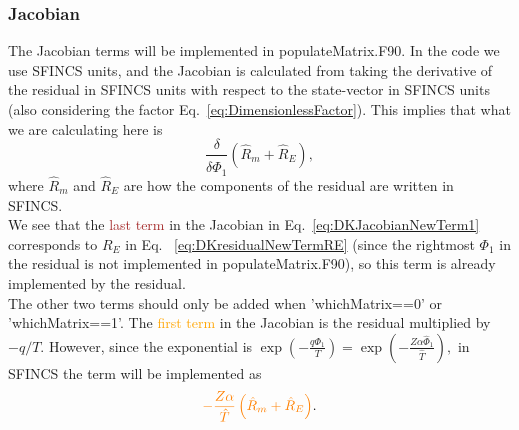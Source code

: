 \documentclass[12pt]{article}
\newcommand{\remark}[1]{\textbf{\textcolor{red}{REMARK: #1}}}
\begin{document}
\subsubsection*{Jacobian}
The Jacobian terms will be implemented in populateMatrix.F90. 
In the code we use SFINCS units, and the Jacobian is calculated from taking the derivative of the residual in SFINCS units with respect to the state-vector in SFINCS units (also considering the factor Eq.~\ref{eq:DimensionlessFactor}). This implies that what we are calculating here is 
\[
\frac{\delta}{\delta \hat{\Phi}_1} \left(\hat{R}_m + \hat{R}_E\right),
\]
where $\hat{R}_m$ and $\hat{R}_E$ are how the components of the residual are written in SFINCS. \\
We see that the \textcolor{brown}{last term} in the Jacobian in Eq.~\ref{eq:DKJacobianNewTerm1} corresponds to $R_E$ in Eq.~ \ref{eq:DKresidualNewTermRE} (since the rightmost $\Phi_1$ in the residual is not implemented in populateMatrix.F90), 
so this term is already implemented by the residual.\\

\noindent The other two terms should only be added when 'whichMatrix==0' or 'whichMatrix==1'. 
The \textcolor{orange}{first term} in the Jacobian is the residual multiplied by $- q / T$. However, since the exponential is 
$ \displaystyle
\exp \left(- \frac{q \Phi_1}{T}  \right) = \exp \left(- \frac{Z \alpha \hat{\Phi}_1}{\hat{T}}  \right), 
$
in SFINCS the term will be implemented as 
\begin{equation}
  \label{eq:JacobianFirstTerm1}
  \textcolor{orange}{- \frac{Z \alpha}{\hat{T}}  \left(\hat{R}_m + \hat{R}_E\right)}.
\end{equation}
\end{document}

